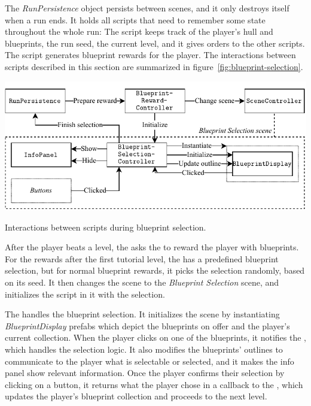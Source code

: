 The \emph{RunPersistence} object persists between scenes, and it only destroys itself when a run ends.
It holds all scripts that need to remember some state throughout the whole run:
The  script keeps track of the player's hull and blueprints, the run seed, the current level, and it gives orders to the other scripts.
The  script generates blueprint rewards for the player.
The interactions between scripts described in this section are summarized in figure~\ref{fig:blueprint-selection}.
\begin{center}
    \captionsetup{type=figure}
    \includegraphics[width=\textwidth]{img/blueprint selection.pdf}
    \caption{Interactions between scripts during blueprint selection.}
    \label{fig:blueprint-selection}
\end{center}

After the player beats a level, the  asks the  to reward the player with blueprints.
For the rewards after the first tutorial level, the  has a predefined blueprint selection, but for normal blueprint rewards, it picks the selection randomly, based on its seed.
It then changes the scene to the \emph{Blueprint Selection} scene, and initializes the  script in it with the selection.

The  handles the blueprint selection.
It initializes the scene by instantiating \emph{BlueprintDisplay} prefabs which depict the blueprints on offer and the player's current collection.
When the player clicks on one of the blueprints, it notifies the , which handles the selection logic.
It also modifies the blueprints' outlines to communicate to the player what is selectable or selected, and it makes the info panel show relevant information.
Once the player confirms their selection by clicking on a button, it returns what the player chose in a callback to the , which updates the player's blueprint collection and proceeds to the next level.

